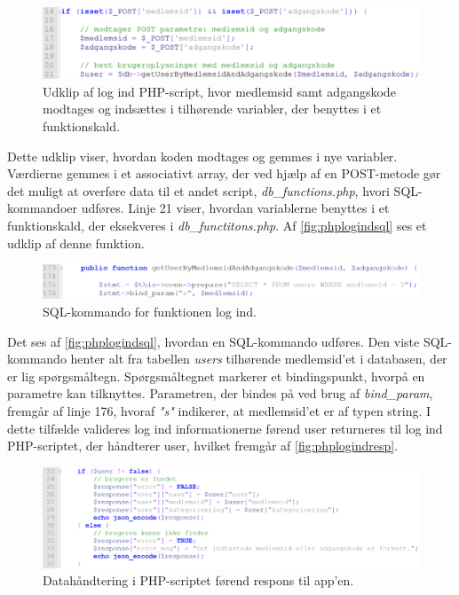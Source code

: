 \begin{figure} [H]
\centering
\includegraphics[width=1\textwidth]{figures/imple/phplogind}
\caption{Udklip af log ind PHP-script, hvor medlemsid samt adgangskode modtages og indsættes i tilhørende variabler, der benyttes i et funktionskald.}
\label{fig:phplogind}
\end{figure}

\noindent
Dette udklip viser, hvordan koden modtages og gemmes i nye variabler. Værdierne gemmes i et associativt array, der ved hjælp af en POST-metode gør det muligt at overføre data til et andet script, \textit{db\_functions.php}, hvori SQL-kommandoer udføres. Linje 21 viser, hvordan variablerne benyttes i et funktionskald, der eksekveres i \textit{db\_functitons.php}. Af \autoref{fig:phplogindsql} ses et udklip af denne funktion.

\begin{figure} [H]
\centering
\includegraphics[width=1\textwidth]{figures/imple/phplogindsql}
\caption{SQL-kommando for funktionen log ind.}
\label{fig:phplogindsql}
\end{figure}

\noindent
Det ses af \autoref{fig:phplogindsql}, hvordan en SQL-kommando udføres. Den viste SQL-kommando henter alt fra tabellen \textit{users} tilhørende medlemsid'et i databasen, der er lig spørgsmåltegn. Spørgsmåltegnet markerer et bindingspunkt, hvorpå en parametre kan tilknyttes. Parametren, der bindes på ved brug af \textit{bind\_param}, fremgår af linje 176, hvoraf \textit{"s"} indikerer, at medlemsid'et er af typen string. I dette tilfælde valideres log ind informationerne førend user returneres til log ind PHP-scriptet, der håndterer user, hvilket fremgår af \autoref{fig:phplogindresp}.


\begin{figure} [H]
\centering
\includegraphics[width=1\textwidth]{figures/imple/phplogindresp}
\caption{Datahåndtering i PHP-scriptet førend respons til app'en.}
\label{fig:phplogindresp}
\end{figure}


